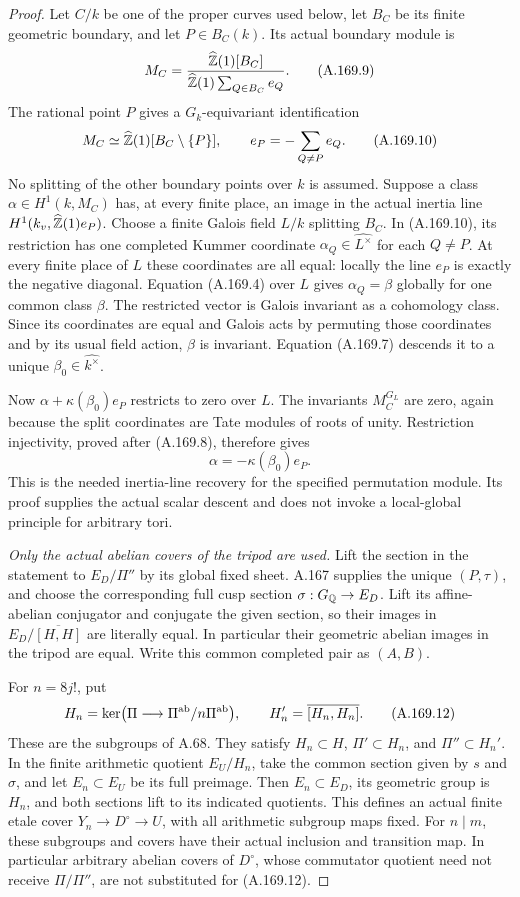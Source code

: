 \begin{proof}
Let \(C/k\) be one of the proper curves used below, let \(B_C\)
be its finite geometric boundary, and let \(P\in B_C(k)\).
Its actual boundary module is
\[
 M_C=\frac{\widehat{\mathbb Z}(1)[B_C]}{
                 \widehat{\mathbb Z}(1)\sum_{Q\in B_C}e_Q}.
\tag{A.169.9}
\]
The rational point \(P\) gives a \(G_k\)-equivariant
identification
\[
 M_C\simeq\widehat{\mathbb Z}(1)[B_C\setminus\{P\}],
           \qquad e_P=-\sum_{Q\ne P}e_Q.
\tag{A.169.10}
\]
No splitting of the other boundary points over \(k\) is assumed.
Suppose a class \(\alpha\in H^1(k,M_C)\) has, at every finite
place, an image in the actual inertia line
\(H^1(k_v,\widehat{\mathbb Z}(1)e_P)\).  Choose a finite Galois field
\(L/k\) splitting \(B_C\).  In (A.169.10), its restriction has
one completed Kummer coordinate \(\alpha_Q\in\widehat{L^\times}\)
for each \(Q\ne P\).  At every finite place of \(L\) these
coordinates are all equal: locally the line \(e_P\) is exactly
the negative diagonal.  Equation (A.169.4) over \(L\) gives
\(\alpha_Q=\beta\) globally for one common class \(\beta\).
The restricted vector is Galois invariant as a cohomology class.
Since its coordinates are equal and Galois acts by permuting those
coordinates and by its usual field action, \(\beta\) is invariant.
Equation (A.169.7) descends it to a unique
\(\beta_0\in\widehat{k^\times}\).

Now \(\alpha+\kappa(\beta_0)e_P\) restricts to zero over
\(L\).  The invariants \(M_C^{G_L}\) are zero, again because
the split coordinates are Tate modules of roots of unity.
Restriction injectivity, proved after (A.169.8), therefore gives
\[
                  \alpha=-\kappa(\beta_0)e_P.
\tag{A.169.11}
\]
This is the needed inertia-line recovery for the specified permutation
module.  Its proof supplies the actual scalar descent and does not
invoke a local-global principle for arbitrary tori.

\emph{Only the actual abelian covers of the tripod are used.}
Lift the section in the statement to \(E_D/\Pi''\) by its global
fixed sheet.  A.167 supplies the unique \((P,\tau)\), and choose
the corresponding full cusp section \(\sigma:G_\mathbb Q\to E_D\).
Lift its affine-abelian conjugator and conjugate the given section,
so their images in \(E_D/\overline{[H,H]}\) are literally equal.
In particular their geometric abelian images in the tripod are
equal.  Write this common completed pair as \((A,B)\).

For \(n=8j!\), put
\[
 H_n=\ker\bigl(\Pi\longrightarrow\Pi^{\rm ab}/n\Pi^{\rm ab}\bigr),
             \qquad H_n'=\overline{[H_n,H_n]}.
\tag{A.169.12}
\]
These are the subgroups of A.68.  They satisfy
\(H_n\subset H\), \(\Pi'\subset H_n\), and
\(\Pi''\subset H_n'\).  In the finite arithmetic quotient
\(E_U/H_n\), take the common section given by \(s\) and
\(\sigma\), and let \(E_n\subset E_U\) be its full preimage.
Then \(E_n\subset E_D\), its geometric group is \(H_n\),
and both sections lift to its indicated quotients.  This defines an
actual finite etale cover \(Y_n\to D^\circ\to U\), with all
arithmetic subgroup maps fixed.  For \(n\mid m\), these
subgroups and covers have their actual inclusion and transition map.
In particular arbitrary abelian covers of \(D^\circ\), whose
commutator quotient need not receive \(\Pi/\Pi''\), are not
substituted for (A.169.12).


\end{proof}
